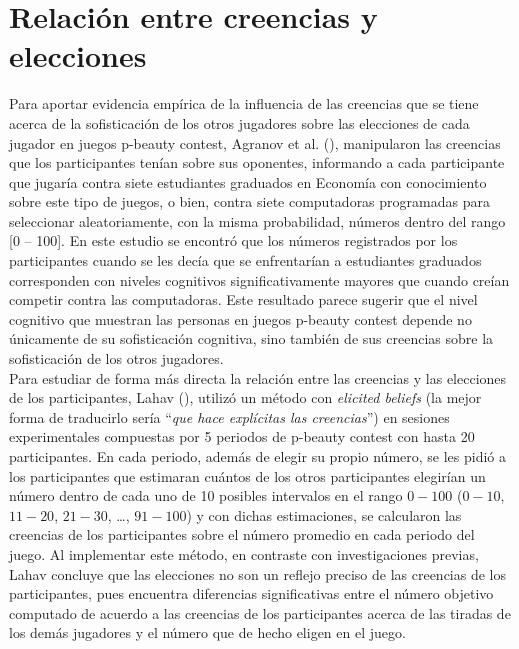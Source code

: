 \section{Relación entre creencias y elecciones}

Para aportar evidencia empírica de la influencia de las creencias que se tiene acerca de la sofisticación de los otros jugadores sobre las elecciones de cada jugador en juegos p-beauty contest, Agranov et al. (\citeyear{Agranov}), manipularon las creencias que los participantes tenían sobre sus oponentes, informando a cada participante que jugaría contra siete estudiantes graduados en Economía con conocimiento sobre este tipo de juegos, o bien, contra siete computadoras programadas para seleccionar aleatoriamente, con la misma probabilidad,  números dentro del rango [0 – 100]. En este estudio se encontró que los números registrados por los participantes cuando se les decía que se enfrentarían a estudiantes graduados corresponden con niveles cognitivos significativamente mayores que cuando creían competir contra las computadoras. Este resultado parece sugerir que el nivel cognitivo que muestran las personas en juegos p-beauty contest depende no únicamente de su sofisticación cognitiva, sino también de sus creencias sobre la sofisticación de los otros jugadores.\\

Para estudiar de forma más directa la relación entre las creencias y las elecciones de los participantes, Lahav (\citeyear{Lahav}), utilizó un método con \textit{elicited beliefs} (la mejor forma de traducirlo sería “\textit{que hace explícitas las creencias}”) en sesiones experimentales compuestas por 5 periodos de p-beauty contest con hasta 20 participantes. En cada periodo, además de elegir su propio número, se les pidió a los participantes que estimaran cuántos de los otros participantes elegirían un número dentro de cada uno de 10 posibles intervalos en el rango $0-100$ ($0-10$, $11-20$, $21-30$, …, $91-100$) y con dichas estimaciones, se calcularon las creencias de los participantes sobre el número promedio en cada periodo del juego. Al implementar este método, en contraste con investigaciones previas, Lahav concluye que las elecciones no son un reflejo preciso de las creencias de los participantes, pues encuentra diferencias significativas entre el número objetivo computado de acuerdo a las creencias de los participantes acerca de las tiradas de los demás jugadores y el número que de hecho eligen en el juego.\\

